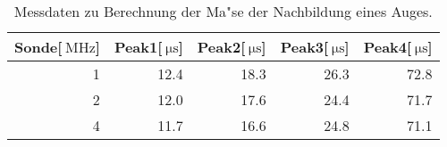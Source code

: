 \begin{table}[!h]
\begin{center}
\begin{tabular}{|r|r|r|r|r|}
\hline
Sonde[$\SI{}{\mega\hertz}$] & Peak1[$\SI{}{\micro\second}$] & Peak2[$\SI{}{\micro\second}$] & Peak3[$\SI{}{\micro\second}$] & Peak4[$\SI{}{\micro\second}$]\\
\hline
\hline
1 &	12.4 &	18.3 &	26.3 &	72.8\\
2 &	12.0 &	17.6 &	24.4 &	71.7\\
4 &	11.7 &	16.6 &	24.8 &	71.1\\
\hline
\end{tabular}
\caption[]{Messdaten zu Berechnung der Ma"se der Nachbildung eines Auges.}
\label{auge1}
\end{center}
\end{table}